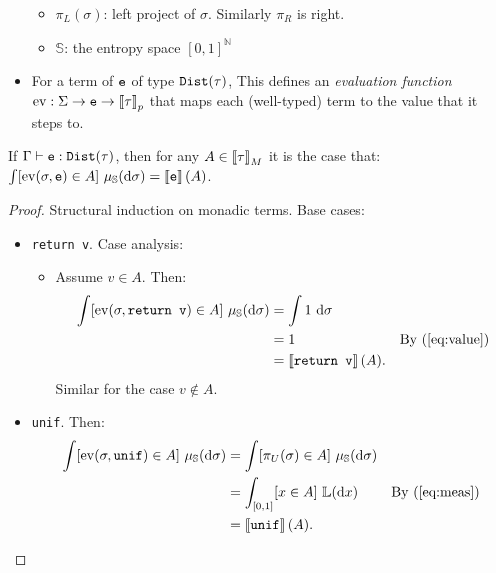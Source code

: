\documentclass{tufte-handout}
\begin{document}
\begin{itemize}
{\begin{itemize}
      \item $\pi_L(\sigma)$: left project of $\sigma$. Similarly $\pi_R$ is right.
      \item $\mathbb{S}$: the entropy space $[0,1]^\mathbb{N}$
    \end{itemize}
  }
  \item For a term of $\texttt{e}$ of type $\mathtt{Dist}(\tau)$,
  This defines an \emph{evaluation function} $\mathrm{ev} : \Sigma \rightarrow \texttt{e} \rightarrow \left \llbracket {\tau} \right \rrbracket_p$ 
  that maps each (well-typed) term to the value that it steps to.
\end{itemize}

\begin{theorem}[Adequacy] If $\Gamma \vdash \texttt{e} : \mathtt{Dist}(\tau)$, then for any 
  $A \in \left \llbracket {\tau} \right \rrbracket_M$ it is the case that:
  $\int [\mathrm{ev}(\sigma, \texttt{e}) \in A] ~\mu_{\mathbb{S}}(\mathrm{d}\sigma) = \left \llbracket {\texttt{e}} \right \rrbracket(A)$.
\end{theorem}
\begin{proof}
  Structural induction on monadic terms. Base cases:
  \begin{itemize}
    \item \texttt{return v}. Case analysis: 
    \begin{itemize}
      \item Assume $v \in A$. Then:
          \begin{align*}
           \int [\mathrm{ev}(\sigma, \texttt{return v}) \in A] ~\mu_{\mathbb{S}}(\mathrm{d}\sigma) &= \int 1 ~\mathrm{d}\sigma  \\
           &= 1 & \text {By (\ref{eq:value})}\\
           &= \left \llbracket {\texttt{return v}} \right \rrbracket(A).
        \end{align*}
        Similar for the case $v \notin A$.
    \end{itemize}
    \item \texttt{unif}. Then:
    \begin{align*}
      \int [\mathrm{ev}(\sigma, \texttt{unif}) \in A] ~\mu_{\mathbb{S}}(\mathrm{d}\sigma) &=
      \int [\pi_U(\sigma) \in A] ~\mu_{\mathbb{S}}(\mathrm{d}\sigma) \\
      &= \int_{[0,1]} [x \in A]~\mathbb{L}(\mathrm{d}x) & \text{By (\ref{eq:meas})} \\ 
      &= \left \llbracket {\texttt{unif}} \right \rrbracket(A).
    \end{align*}
  \end{itemize}
\end{proof}



\end{document}
